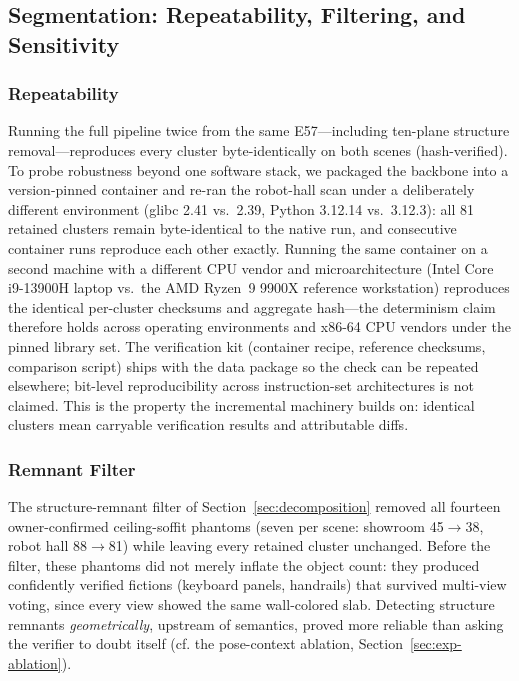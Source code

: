 \documentclass[electronics,article,accept,pdftex,moreauthors]{Definitions/mdpi}
\begin{document}
\subsection{Segmentation: Repeatability, Filtering, and Sensitivity}
\label{sec:exp-seg}

\subsubsection{Repeatability}
Running the full pipeline twice from the same E57---including ten-plane
structure removal---reproduces every cluster byte-identically on both
scenes (hash-verified). To probe robustness beyond one software stack, we
packaged the backbone into a version-pinned container and re-ran the
robot-hall scan under a deliberately different environment (glibc 2.41
vs.\ 2.39, Python 3.12.14 vs.\ 3.12.3): all 81 retained clusters remain
byte-identical to the native run, and consecutive container runs
reproduce each other exactly. Running the same container on a second
machine with a different CPU vendor and microarchitecture (Intel Core
i9-13900H laptop vs.\ the AMD Ryzen~9 9900X reference workstation)
reproduces the identical per-cluster checksums and aggregate hash---the
determinism claim therefore holds across operating environments and
x86-64 CPU vendors under the pinned library set. The verification kit
(container recipe,
reference checksums, comparison script) ships with the data package so
the check can be repeated elsewhere; bit-level
reproducibility across instruction-set architectures is not claimed.
This is the property the incremental machinery
builds on: identical clusters mean carryable verification results and
attributable diffs.

\subsubsection{Remnant Filter}
The structure-remnant filter of Section~\ref{sec:decomposition} removed all
fourteen owner-confirmed ceiling-soffit phantoms (seven per scene: showroom
45$\rightarrow$38, robot hall 88$\rightarrow$81) while leaving every retained
cluster
unchanged. Before the filter, these phantoms did not merely inflate the
object count: they produced confidently verified fictions (keyboard panels,
handrails) that survived multi-view voting, since every view showed the same
wall-colored slab. Detecting structure remnants \emph{geometrically},
upstream of semantics, proved more reliable than asking the verifier to
doubt itself (cf. the pose-context ablation, Section~\ref{sec:exp-ablation}).
\end{document}
